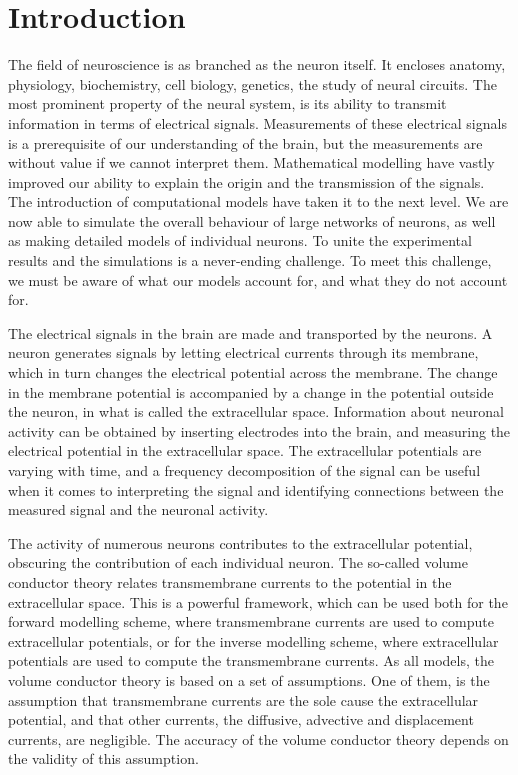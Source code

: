 \documentclass{article}
\begin{document}
\tableofcontents %
\section{Introduction}\label{Introduction}

The field of neuroscience is as branched as the neuron itself. It encloses anatomy, physiology, biochemistry, cell biology, genetics, the study of neural circuits. The most prominent property of the neural system, is its ability to transmit information in terms of electrical signals. Measurements of these electrical signals is a prerequisite of our understanding of the brain, but the measurements are without value if we cannot interpret them. Mathematical modelling have vastly improved our ability to explain the origin and the transmission of the signals. The introduction of computational models have taken it to the next level. We are now able to simulate the overall behaviour of large networks of neurons, as well as making detailed models of individual neurons. To unite the experimental results and the simulations is a never-ending challenge. To meet this challenge, we must be aware of what our models account for, and what they do not account for. 

The electrical signals in the brain are made and transported by the neurons. A neuron generates signals by letting electrical currents through its membrane, which in turn changes the electrical potential across the membrane. The change in the membrane potential is accompanied by a change in the potential outside the neuron, in what is called the extracellular space. Information about neuronal activity can be obtained by inserting electrodes into the brain, and measuring the electrical potential in the extracellular space. The extracellular potentials are varying with time, and a frequency decomposition of the signal can be useful when it comes to interpreting the signal and identifying connections between the measured signal and the neuronal activity.

The activity of numerous neurons contributes to the extracellular potential, obscuring the contribution of each individual neuron. The so-called volume conductor theory relates transmembrane currents to the potential in the extracellular space. This is a powerful framework, which can be used both for the forward modelling scheme, where transmembrane currents are used to compute extracellular potentials, or for the inverse modelling scheme, where extracellular potentials are used to compute the transmembrane currents. As all models, the volume conductor theory is based on a set of assumptions. One of them, is the assumption that transmembrane currents are the sole cause the extracellular potential, and that other currents, the diffusive, advective and displacement currents, are negligible. The accuracy of the volume conductor theory depends on the validity of this assumption.
\end{document}
